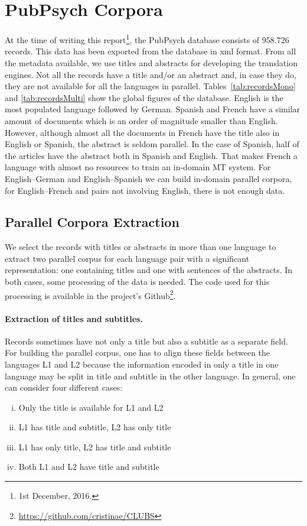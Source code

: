 \documentclass[a4paper,11pt]{article}
\begin{document}
\section{PubPsych Corpora}
\label{s:pub}

At the time of writing this report\footnote{1st December, 2016.}, the PubPsych database consists of 958.726 records. This data has been exported from the database in xml format. From all the metadata available, we use titles and abstracts for developing the translation engines. Not all the records have a title and/or an abstract and, in case they do, they are not available for all the languages in parallel. Tables~\ref{tab:recordsMono} and \ref{tab:recordsMulti} show the global figures of the database. English is the most populated language followed by German. Spanish and French have a similar amount of documents which is an order of magnitude smaller than English. However, although almost all the documents in French have the title also in English or Spanish, the abstract is seldom parallel. In the case of Spanish, half of the articles have the abstract both in Spanish and English. That makes French a language with almost no resources to train an in-domain MT system. For English--German and English--Spanish we can build in-domain parallel corpora, for English--French and pairs not involving English, there is not enough data.


\subsection{Parallel Corpora Extraction}
\label{ss:pubPar}

We select the records with titles or abstracts in more than one language to extract two parallel corpus for each language pair with a significant representation: one containing titles and one with sentences of the abstracts. In both cases, some processing of the data is needed. The code used for this processing is available in the project's Github\footnote{\url{https://github.com/cristinae/CLUBS}}.

\paragraph{Extraction of titles and subtitles.}
Records sometimes have not only a title but also a subtitle as a separate field. For building the parallel corpus, one has to align these fields between the languages L1 and L2 because the information encoded in only a title in one language may be split in title and subtitle in the other language. In general, one can consider four different cases:
\begin{enumerate}[(i)]
\itemsep0em 
 \item Only the title is available for L1 and L2
 \item L1 has title and subtitle, L2 has only title
 \item L1 has only title, L2 has title and subtitle
 \item Both L1 and L2 have title and subtitle
\end{enumerate}
\end{document}
